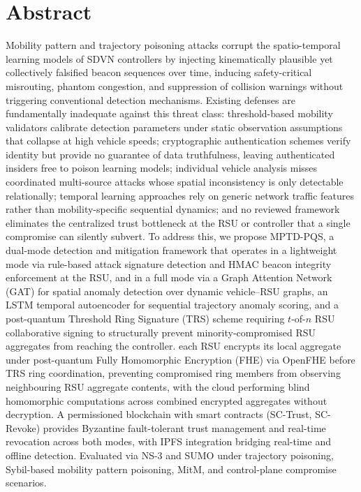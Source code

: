 \documentclass[12pt, a4paper]{report}
\begin{document}
\justifying


\renewcommand{\thepage}{\roman{page}} %

\chapter*{Abstract}


Mobility pattern and trajectory poisoning attacks corrupt the spatio-temporal
learning models of SDVN controllers by injecting kinematically plausible yet
collectively falsified beacon sequences over time, inducing safety-critical
misrouting, phantom congestion, and suppression of collision warnings without
triggering conventional detection mechanisms.
Existing defenses are fundamentally inadequate against this threat class:
threshold-based mobility validators calibrate detection parameters under
static observation assumptions that collapse at high vehicle speeds;
cryptographic authentication schemes verify identity but provide no guarantee
of data truthfulness, leaving authenticated insiders free to poison learning
models; individual vehicle analysis misses coordinated multi-source attacks
whose spatial inconsistency is only detectable relationally; temporal learning
approaches rely on generic network traffic features rather than mobility-specific
sequential dynamics; and no reviewed framework eliminates the centralized trust
bottleneck at the RSU or controller that a single compromise can silently
subvert. To address this, we propose MPTD-PQS, a dual-mode detection and mitigation
framework that operates in a lightweight mode via rule-based attack signature
detection and HMAC beacon integrity enforcement at the RSU, and in a full mode
via a Graph Attention Network (GAT) for spatial anomaly detection over dynamic
vehicle--RSU graphs, an LSTM temporal autoencoder for sequential trajectory
anomaly scoring, and a post-quantum Threshold Ring Signature (TRS) scheme
requiring $t$-of-$n$ RSU collaborative signing to structurally prevent
minority-compromised RSU aggregates from reaching the controller. each RSU encrypts its local aggregate under post-quantum Fully Homomorphic Encryption (FHE) via OpenFHE before TRS ring coordination, preventing
compromised ring members from observing neighbouring RSU aggregate contents,
with the cloud performing blind homomorphic computations across combined
encrypted aggregates without decryption. A permissioned
blockchain with smart contracts (SC-Trust, SC-Revoke) provides Byzantine
fault-tolerant trust management and real-time revocation across both modes,
with IPFS integration bridging real-time and offline detection. Evaluated
via NS-3 and SUMO under trajectory poisoning, Sybil-based mobility pattern
poisoning, MitM, and control-plane compromise scenarios.
\end{document}
